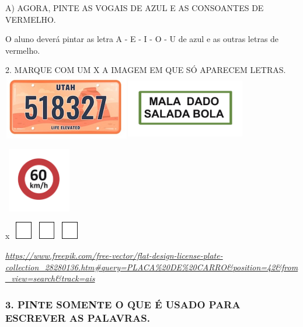 A) AGORA, PINTE AS VOGAIS DE AZUL E AS CONSOANTES DE VERMELHO.

O aluno deverá pintar as letra A - E - I - O - U de azul e as
outras letras de vermelho.

2. MARQUE COM UM X A IMAGEM EM QUE SÓ APARECEM
LETRAS.\includegraphics[width=2.18819in,height=1.11111in]{media/image2.png}\includegraphics[width=2.03681in,height=1.04861in]{media/image3.png}

\includegraphics[width=1.20556in,height=1.11111in]{media/image4.png}

x
\includegraphics[width=0.40972in,height=0.30069in]{media/image5.png}\includegraphics[width=0.40972in,height=0.30069in]{media/image5.png}\includegraphics[width=0.40972in,height=0.30069in]{media/image5.png}

\href{https://www.freepik.com/free-vector/flat-design-license-plate-collection_28280136.htm\#query=PLACA\%20DE\%20CARRO\&position=42\&from_view=search\&track=ais}{\emph{https://www.freepik.com/free-vector/flat-design-license-plate-collection\_28280136.htm\#query=PLACA\%20DE\%20CARRO\&position=42\&from\_view=search\&track=ais}}

\subsubsection{3. PINTE SOMENTE O QUE É USADO PARA ESCREVER AS
PALAVRAS.}\label{pinte-somente-o-que-uxe9-usado-para-escrever-as-palavras.}

